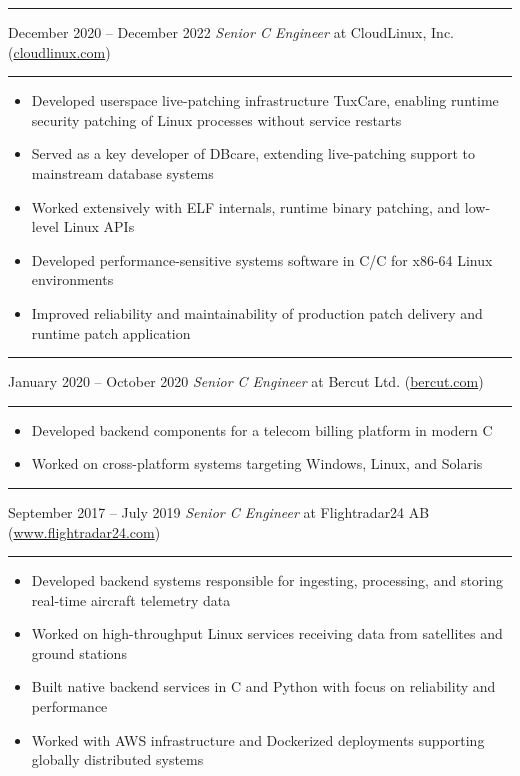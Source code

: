 \documentclass[12pt]{article}
\newcommand\CXX{C\nolinebreak[4]\hspace{-.05em}\raisebox{.4ex}{\relsize{-3}{\textbf{++}}}}
\newcommand\CvSmallSkipLength{0.5em}
\newcommand\CvSkip[1]{\vspace{#1}}
\newcommand\CvSmallSkip{\CvSkip{\CvSmallSkipLength}}
\newcommand\CvRule{\begingroup\color{CvRuleColor}\hrule\endgroup}
\newcommand\CvWorkplaceHeader[5]{
  \begingroup%
    \CvRule\nopagebreak%
    \fboxsep0pt%
    \colorbox{CvWorkplaceHeaderColor}{%
      \begin{minipage}{\linewidth-2\fboxsep}%
\CvSmallSkip%
#1 -- #2 \hfill \textit{#3} at #4 (\href{http://#5/}{#5})%
\CvSmallSkip%
      \end{minipage}%
    }%
    \CvRule%
  \endgroup%
}
\newenvironment{CvWorkplaceDescription}{%
    \begingroup\setlength\parskip{\CvSmallSkipLength}%
  }{%
    \CvSmallSkip\endgroup%
  }
\begin{document}
\CvWorkplaceHeader{December 2020}{December 2022}{Senior {\CXX} Engineer}{CloudLinux, Inc.}{cloudlinux.com}

\begin{CvWorkplaceDescription}
\begin{itemize}[noitemsep]
  \item Developed userspace live-patching infrastructure TuxCare, enabling runtime security patching of Linux processes without service restarts
  \item Served as a key developer of DBcare, extending live-patching support to mainstream database systems
  \item Worked extensively with ELF internals, runtime binary patching, and low-level Linux APIs
  \item Developed performance-sensitive systems software in C/{\CXX} for x86-64 Linux environments
  \item Improved reliability and maintainability of production patch delivery and runtime patch application
\end{itemize}
\end{CvWorkplaceDescription}

\CvWorkplaceHeader{January 2020}{October 2020}{Senior {\CXX} Engineer}{Bercut Ltd.}{bercut.com}

\begin{CvWorkplaceDescription}
\begin{itemize}[noitemsep]
  \item Developed backend components for a telecom billing platform in modern \CXX
  \item Worked on cross-platform systems targeting Windows, Linux, and Solaris
\end{itemize}
\end{CvWorkplaceDescription}

\CvWorkplaceHeader{September 2017}{July 2019}{Senior {\CXX} Engineer}{Flightradar24 AB}{www.flightradar24.com}

\begin{CvWorkplaceDescription}

\begin{itemize}[noitemsep]
  \item Developed backend systems responsible for ingesting, processing, and storing real-time aircraft telemetry data
  \item Worked on high-throughput Linux services receiving data from satellites and ground stations
  \item Built native backend services in {\CXX} and Python with focus on reliability and performance
  \item Worked with AWS infrastructure and Dockerized deployments supporting globally distributed systems
\end{itemize}
\end{CvWorkplaceDescription}
\end{document}
